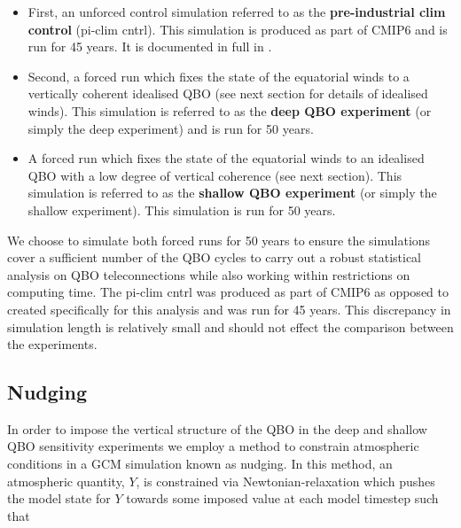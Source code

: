 \begin{itemize}
    \item First, an unforced control simulation referred to as the \textbf{pre-industrial clim control} (pi-clim cntrl). This simulation is produced as part of CMIP6 and is run for 45 years. It is documented in full in \cite{oconnorAssessment2021b}. 
    
    \item Second, a forced run which fixes the state of the equatorial winds to a vertically coherent idealised QBO (see next section for details of idealised winds). This simulation is referred to as the \textbf{deep QBO experiment} (or simply the deep experiment) and is run for 50 years.
    
    \item A forced run which fixes the state of the equatorial winds to an idealised QBO with a low degree of vertical coherence (see next section). This simulation is referred to as the \textbf{shallow QBO experiment} (or simply the shallow experiment). This simulation is run for 50 years.
    
\end{itemize}

We choose to simulate both forced runs for 50 years to ensure the simulations cover a sufficient number of the QBO cycles to carry out a robust statistical analysis on QBO teleconnections while also working within restrictions on computing time. The pi-clim cntrl was produced as part of CMIP6 as opposed to created specifically for this analysis and was run for 45 years. This discrepancy in simulation length is relatively small and should not effect the comparison between the experiments. 



\subsection{Nudging}
In order to impose the vertical structure of the QBO in the deep and shallow QBO sensitivity experiments we employ a method to constrain atmospheric conditions in a GCM simulation known as nudging. In this method, an atmospheric quantity, $Y$, is constrained via Newtonian-relaxation which pushes the model state for $Y$ towards some imposed value at each model timestep such that

